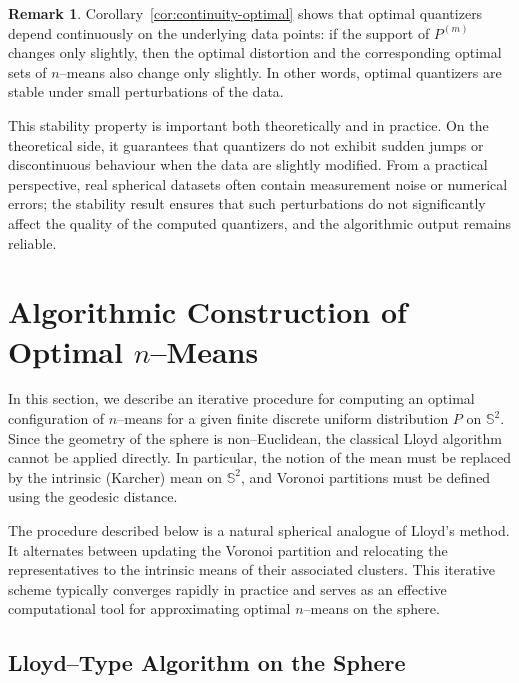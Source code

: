 \documentclass[12pt, reqno]{amsart}
\theoremstyle{plain}
\theoremstyle{definition}
\newtheorem{remark}[subsection]{Remark}
\newcommand{\D}[1]{\mathbb{#1}}%
\begin{document}
\begin{remark}\label{rem:stability-significance}
Corollary~\ref{cor:continuity-optimal} shows that optimal quantizers depend continuously on the 
underlying data points: if the support of $P^{(m)}$ changes only slightly, then the optimal 
distortion and the corresponding optimal sets of $n$–means also change only slightly. 
In other words, optimal quantizers are stable under small perturbations of the data.

This stability property is important both theoretically and in practice. 
On the theoretical side, it guarantees that quantizers do not exhibit sudden jumps or 
discontinuous behaviour when the data are slightly modified. 
From a practical perspective, real spherical datasets often contain measurement noise or 
numerical errors; the stability result ensures that such perturbations do not significantly 
affect the quality of the computed quantizers, and the algorithmic output remains reliable.
\end{remark}




\section{Algorithmic Construction of Optimal $n$--Means} \label{sec6}



In this section, we describe an iterative procedure for computing an optimal configuration of $n$--means
for a given finite discrete uniform distribution $P$ on $\D S^2$. Since the geometry of the sphere is
non--Euclidean, the classical Lloyd algorithm cannot be applied directly. In particular, the notion of
the mean must be replaced by the intrinsic (Karcher) mean on $\D S^2$, and Voronoi partitions must be
defined using the geodesic distance.

The procedure described below is a natural spherical analogue of Lloyd's method. It alternates between
updating the Voronoi partition and relocating the representatives to the intrinsic means of their associated
clusters. This iterative scheme typically converges rapidly in practice and serves as an effective computational
tool for approximating optimal $n$--means on the sphere.

\medskip

\subsection{Lloyd--Type Algorithm on the Sphere}
\end{document}
